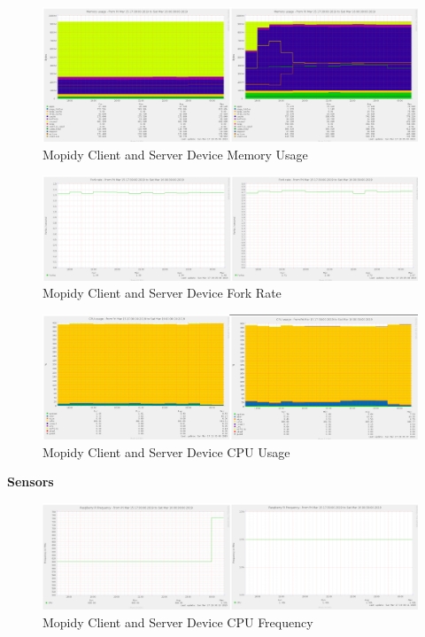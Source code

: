 \documentclass[11pt,a4paper,headinclude=false,footinclude=false]{scrreprt}
\begin{document}
\begin{figure}[H]
\includegraphics{ResultsAndAnalysis/MopidyServerTestImages/017MopidyMemoryUsage.png}
\centering
\caption{Mopidy Client and Server Device Memory Usage}
\label{MopidyMemUse}
\end{figure}

\begin{figure}[H]
\includegraphics{ResultsAndAnalysis/MopidyServerTestImages/013MopidyForkRate.png}
\centering
\caption{Mopidy Client and Server Device Fork Rate}
\label{MopidyForkRate}
\end{figure}

\begin{figure}[H]
\includegraphics{ResultsAndAnalysis/MopidyServerTestImages/004MopidyCPUUsage.png}
\centering
\caption{Mopidy Client and Server Device CPU Usage}
\label{MopidyCPUUsage}
\end{figure}

\textbf{Sensors}

\begin{figure}[H]
\includegraphics{ResultsAndAnalysis/MopidyServerTestImages/001MopidyCPUFreq.png}
\centering
\caption{Mopidy Client and Server Device CPU Frequency}
\label{MopidyCPUFreq}
\end{figure}
\end{document}
